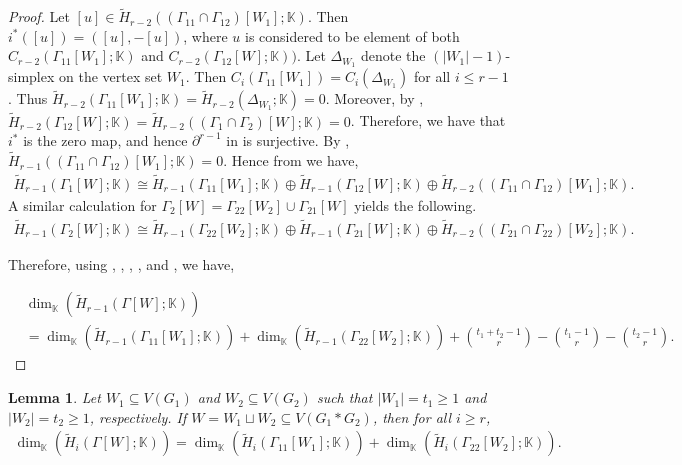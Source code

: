 \documentclass[12pt,reqno]{amsart}
\newtheorem{lemma}[proposition]{Lemma}
\theoremstyle{definition}
\newcommand{\K}{\mathbb K}
\begin{document}
\begin{proof}
Let $[u]\in \widetilde H_{r-2}((\Gamma_{11}\cap\Gamma_{12})[W_1];\K)$. Then $i^*([u])=([u],-[u])$, where $u$ is considered to be element of both $C_{r-2}(\Gamma_{11}[W_1];\K)$ and $C_{r-2}(\Gamma_{12}[W];\K))$. Let $\Delta_{W_1}$ denote the $(|W_1|-1)$-simplex on the vertex set $W_1$. Then $C_i(\Gamma_{11}[W_1])=C_i(\Delta_{W_1})$ for all $i\le r-1$. Thus $\widetilde H_{r-2}(\Gamma_{11}[W_1];\K)=\widetilde H_{r-2}(\Delta_{W_1};\K)=0$. Moreover, by , $\widetilde H_{r-2}(\Gamma_{12}[W];\K)=\widetilde H_{r-2}((\Gamma_{1}\cap\Gamma_2)[W];\K)=0$. Therefore, we have that $i^*$ is the zero map, and hence $\partial^{r-1}$ in  is surjective. By  , $\widetilde H_{r-1}((\Gamma_{11}\cap\Gamma_{12})[W_1];\K)=0$. Hence from  we have,
{\footnotesize
    \begin{align}\label{eq4}
        \widetilde H_{r-1}(\Gamma_1[W];\K)\cong \widetilde H_{r-1}(\Gamma_{11}[W_1];\K)\oplus \widetilde H_{r-1}(\Gamma_{12}[W];\K)\oplus \widetilde H_{r-2}((\Gamma_{11}\cap\Gamma_{12})[W_1];\K).
    \end{align}}
    A similar calculation for $\Gamma_2[W]=\Gamma_{22}[W_2]\cup\Gamma_{21}[W]$ yields the following.
{\footnotesize
\begin{align}\label{eq5}
        \widetilde H_{r-1}(\Gamma_2[W];\K)\cong \widetilde H_{r-1}(\Gamma_{22}[W_2];\K)\oplus \widetilde H_{r-1}(\Gamma_{21}[W];\K)\oplus \widetilde H_{r-2}((\Gamma_{21}\cap\Gamma_{22})[W_2];\K).
    \end{align}}

    Therefore, using , , , ,  and , we have,

{\footnotesize
    \begin{align*}
     &\dim_{\K}(\widetilde H_{r-1}(\Gamma[W];\K))\\
     &=\dim_{\K}(\widetilde H_{r-1}(\Gamma_{11}[W_1];\K))+\dim_{\K}(\widetilde H_{r-1}(\Gamma_{22}[W_2];\K))+{t_1+t_2-1\choose r}-{t_1-1\choose r}-{t_2-1\choose r}.   
    \end{align*}}
\end{proof}

\begin{lemma}\label{i homology lemma}
    Let $W_1\subseteq V(G_1)$ and $W_2\subseteq V(G_2)$ such that $|W_1|=t_1\ge 1$ and $|W_2|=t_2\ge 1$, respectively. If $W=W_1\sqcup W_2\subseteq V(G_1*G_2)$, then for all $i\ge r$,
{\footnotesize
    \begin{align*}
     \dim_{\K}(\widetilde H_{i}(\Gamma[W];\K))=\dim_{\K}(\widetilde H_{i}(\Gamma_{11}[W_1];\K))+\dim_{\K}(\widetilde H_{i}(\Gamma_{22}[W_2];\K)).   
    \end{align*}}
     \end{lemma}
\end{document}
